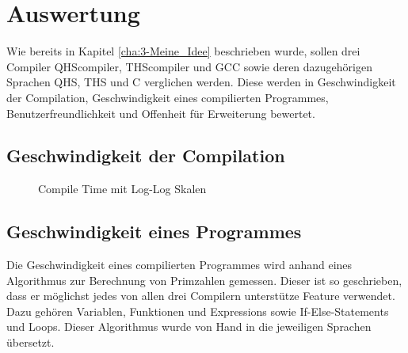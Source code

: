 \chapter{Auswertung}

Wie bereits in Kapitel \ref{cha:3-Meine_Idee} beschrieben wurde, sollen drei Compiler QHScompiler, THScompiler und GCC sowie deren dazugehörigen Sprachen QHS, THS und C verglichen werden.
Diese werden in Geschwindigkeit der Compilation, Geschwindigkeit eines compilierten Programmes, Benutzerfreundlichkeit und Offenheit für Erweiterung bewertet. 

\section{Geschwindigkeit der Compilation}

\begin{figure}[h!]
\centering
{}
\caption{Compile Time mit Log-Log Skalen}
\end{figure}

\section{Geschwindigkeit eines Programmes}
Die Geschwindigkeit eines compilierten Programmes wird anhand eines Algorithmus zur Berechnung von Primzahlen gemessen. Dieser ist so geschrieben, dass er möglichst jedes von allen drei Compilern unterstütze Feature verwendet.
Dazu gehören Variablen, Funktionen und Expressions sowie If-Else-Statements und Loops. Dieser Algorithmus wurde von Hand in die jeweiligen Sprachen übersetzt.



